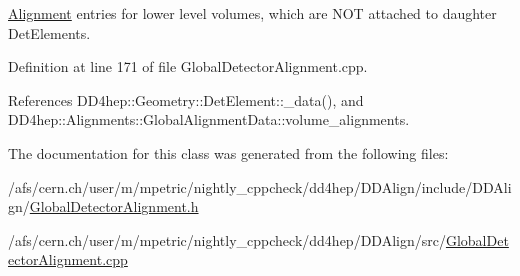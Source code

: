\hyperlink{class_d_d4hep_1_1_alignments_1_1_alignment}{Alignment} entries for lower level volumes, which are N\+OT attached to daughter Det\+Elements. 



Definition at line 171 of file Global\+Detector\+Alignment.\+cpp.



References D\+D4hep\+::\+Geometry\+::\+Det\+Element\+::\+\_\+data(), and D\+D4hep\+::\+Alignments\+::\+Global\+Alignment\+Data\+::volume\+\_\+alignments.



The documentation for this class was generated from the following files\+:\begin{DoxyCompactItemize}
\item 
/afs/cern.\+ch/user/m/mpetric/nightly\+\_\+cppcheck/dd4hep/\+D\+D\+Align/include/\+D\+D\+Align/\hyperlink{_global_detector_alignment_8h}{Global\+Detector\+Alignment.\+h}\item 
/afs/cern.\+ch/user/m/mpetric/nightly\+\_\+cppcheck/dd4hep/\+D\+D\+Align/src/\hyperlink{_global_detector_alignment_8cpp}{Global\+Detector\+Alignment.\+cpp}\end{DoxyCompactItemize}
